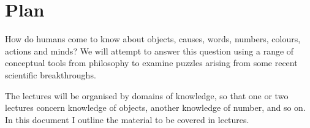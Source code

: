 \documentclass[12pt,\papersize]{extarticle}
\date{}
\begin{document}
\setlength\footnotesep{1em}





\maketitle

\setcounter{secnumdepth}{-1} 


\section{Plan}
How do humans come to know about objects, causes, words, numbers, colours, actions and minds?  We will attempt to answer this question using a range of conceptual tools from philosophy to examine puzzles arising from some recent scientific breakthroughs.

The lectures will be organised by domains of knowledge, so that one or two lectures concern knowledge of objects, another knowledge of number, and so on.  
In this document I outline the material to be covered in lectures.
\end{document}
